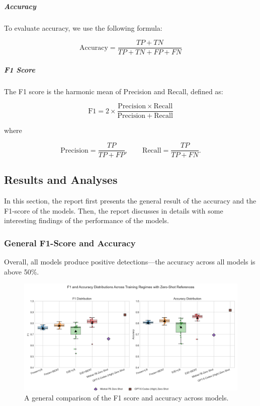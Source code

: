 \documentclass[12pt]{article}
\begin{document}
\subparagraph{Accuracy}
To evaluate accuracy, we use the following formula:

\begin{equation}
\mathrm{Accuracy} = \frac{TP + TN}{TP + TN + FP + FN}
\end{equation}

\subparagraph{F1 Score}
The F1 score is the harmonic mean of Precision and Recall, defined as:

\begin{equation}
\mathrm{F1} = 2 \times \frac{\mathrm{Precision} \times \mathrm{Recall}}{\mathrm{Precision} + \mathrm{Recall}}
\end{equation}

where

\begin{equation}
\mathrm{Precision} = \frac{TP}{TP + FP}, 
\qquad
\mathrm{Recall} = \frac{TP}{TP + FN}.
\end{equation}

\subsection{Results and Analyses}
In this section, the report first presents the general result of the accuracy and the F1-score of the models. Then, the report discusses in details with some interesting findings of the performance of the models.

\subsubsection{General F1-Score and Accuracy}

Overall, all models produce positive detections\;---\;the accuracy across all models is above 50\%.

\begin{figure}[H]
  \begin{adjustwidth}{-2cm}{0cm}
  \centering
  \includegraphics[width=1.3\textwidth]{figures/Accuracy_distribution_4settings.png}
  \caption{A general comparison of the F1 score and accuracy across models.}
  \label{fig:total-comparison}
  \end{adjustwidth}
\end{figure}
\end{document}
